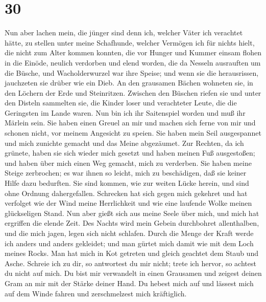\hypertarget{section-29}{%
\section{30}\label{section-29}}

 Nun aber lachen mein, die jünger sind denn ich, welcher
Väter ich verachtet hätte, zu stellen unter meine Schafhunde,
 welcher Vermögen ich für nichts hielt, die nicht zum Alter
kommen konnten,  die vor Hunger und Kummer einsam flohen in
die Einöde, neulich verdorben und elend worden,  die da
Nesseln ausrauften um die Büsche, und Wacholderwurzel war ihre Speise;
 und wenn sie die herausrissen, jauchzeten sie drüber wie
ein Dieb.  An den grausamen Bächen wohneten sie, in den
Löchern der Erde und Steinritzen.  Zwischen den Büschen
riefen sie und unter den Disteln sammelten sie,  die Kinder
loser und verachteter Leute, die die Geringsten im Lande waren.
 Nun bin ich ihr Saitenspiel worden und muß ihr Märlein
sein.  Sie haben einen Greuel an mir und machen sich ferne
von mir und schonen nicht, vor meinem Angesicht zu speien. 
Sie haben mein Seil ausgespannet und mich zunichte gemacht und das Meine
abgezäumet.  Zur Rechten, da ich grünete, haben sie sich
wieder mich gesetzt und haben meinen Fuß ausgestoßen; und haben über
mich einen Weg gemacht, mich zu verderben.  Sie haben meine
Steige zerbrochen; es war ihnen so leicht, mich zu beschädigen, daß sie
keiner Hilfe dazu bedurften.  Sie sind kommen, wie zur
weiten Lücke herein, und sind ohne Ordnung dahergefallen. 
Schrecken hat sich gegen mich gekehret und hat verfolget wie der Wind
meine Herrlichkeit und wie eine laufende Wolke meinen glückseligen
Stand.  Nun aber gießt sich aus meine Seele über mich, und
mich hat ergriffen die elende Zeit.  Des Nachts wird mein
Gebein durchbohret allenthalben, und die mich jagen, legen sich nicht
schlafen.  Durch die Menge der Kraft werde ich anders und
anders gekleidet; und man gürtet mich damit wie mit dem Loch meines
Rocks.  Man hat mich in Kot getreten und gleich geachtet
dem Staub und Asche.  Schreie ich zu dir, so antwortest du
mir nicht; trete ich hervor, so achtest du nicht auf mich. 
Du bist mir verwandelt in einen Grausamen und zeigest deinen Gram an mir
mit der Stärke deiner Hand.  Du hebest mich auf und lässest
mich auf dem Winde fahren und zerschmelzest mich kräftiglich.
